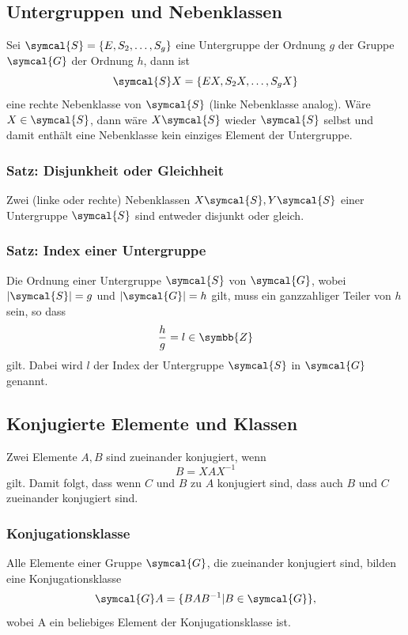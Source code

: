 \documentclass[
  captions=tableheading,  %
  titlepage=firstiscover, %
]{scrartcl}
\begin{document}
\subsection{Untergruppen und Nebenklassen}
Sei $\symcal{S}  = \{E, S_2, \ldots, S_g \}$ eine Untergruppe der Ordnung $g$ der Gruppe $\symcal{G}$
der Ordnung $h$, dann ist 
\begin{equation*}
  \symcal{S}X = \{ EX, S_2X, \ldots, S_g X\}
\end{equation*}
eine rechte Nebenklasse von $\symcal{S}$ (linke Nebenklasse analog).
Wäre $X \in \symcal{S}$, dann wäre $X\symcal{S}$ wieder $\symcal{S}$ selbst und damit enthält
eine Nebenklasse kein einziges Element der Untergruppe.\\
\subsubsection{Satz: Disjunkheit oder Gleichheit}
Zwei (linke oder rechte) Nebenklassen $X\symcal{S}, Y\symcal{S}$ einer Untergruppe $\symcal{S}$ sind entweder 
disjunkt oder gleich.
\subsubsection{Satz: Index einer Untergruppe}
Die Ordnung einer Untergruppe $\symcal{S}$ von $\symcal{G}$, wobei 
$|\symcal{S}| = g$ und $|\symcal{G}| = h$ gilt, muss ein ganzzahliger Teiler von $h$ sein, so dass 
\begin{equation*}
  \frac{h}{g} = l \in \symbb{Z}
\end{equation*}
gilt.
Dabei wird $l$ der Index der Untergruppe $\symcal{S}$ in $\symcal{G}$ genannt.
\subsection{Konjugierte Elemente und Klassen}
Zwei Elemente $A, B$ sind zueinander konjugiert, wenn 
\begin{equation*}
  B = X A X^{-1}
\end{equation*}
gilt.
Damit folgt, dass wenn $C$ und $B$ zu $A$ konjugiert sind, dass auch $B$ und $C$ zueinander konjugiert sind.
\subsubsection{Konjugationsklasse}
Alle Elemente einer Gruppe $\symcal{G}$, die zueinander konjugiert sind, bilden eine Konjugationsklasse
\begin{equation*}
  \symcal{G} A = \{BAB^{-1} | B \in \symcal{G} \},
\end{equation*}
wobei A ein beliebiges Element der Konjugationsklasse ist.
\end{document}
